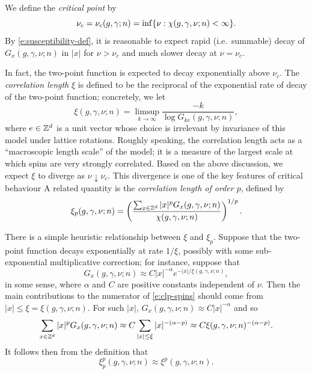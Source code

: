We define the \emph{critical point} by
\begin{equation}
\nu_c = \nu_c(g, \gamma; n) = \inf \{ \nu : \chi(g, \gamma, \nu; n) < \infty \}.
\end{equation}
By \eqref{e:susceptibility-def}, it is
reasonable to expect rapid (i.e.\ summable) decay of $G_x(g, \gamma, \nu; n)$ in $|x|$ for
$\nu > \nu_c$ and much slower decay at $\nu = \nu_c$.

In fact, the two-point function is expected to decay exponentially above $\nu_c$.
The \emph{correlation length} $\xi$ is defined to be the reciprocal of the exponential
rate of decay of the two-point function; concretely, we let
\begin{equation}
\label{e:cl-spins}
\xi(g, \gamma, \nu; n) = \limsup_{k\to\infty} \frac{-k}{\log G_{ke}(g, \gamma, \nu; n)},
\end{equation}
where $e \in { {{\mathbb Z}}^d }$ is a unit vector whose choice is irrelevant by invariance of this model
under lattice rotations.
Roughly speaking, the correlation length acts as
a ``macroscopic length scale'' of the model; it is a measure of the largest scale at
which spins are very strongly correlated. Based on the above discussion, we expect $\xi$
to diverge as $\nu\downarrow\nu_c$. This divergence is one of the
key features of critical behaviour
A related quantity is the \emph{correlation length of order $p$}, defined by
\begin{equation}
\label{e:clp-spins}
\xi_p(g, \gamma, \nu; n)
	=
\left(\frac{\sum_{x\in{ {{\mathbb Z}}^d }} |x|^p G_x(g, \gamma, \nu; n)}{\chi(g, \gamma, \nu; n)}\right)^{1/p}.
\end{equation}

\begin{rk}
There is a simple heuristic relationship between $\xi$ and $\xi_p$. Suppose that
the two-point function decays exponentially at rate $1/\xi$, possibly with some
sub-exponential multiplicative correction; for instance, suppose that
\begin{equation}
G_x(g, \gamma, \nu; n) \approx C |x|^{-\alpha} e^{-|x|/\xi(g, \gamma, \nu; n)},
\end{equation}
in some sense, where $\alpha$ and $C$ are positive constants independent of $\nu$.
Then the main contributions to the numerator of
\eqref{e:clp-spins} should come from $|x| \le \xi = \xi(g, \gamma, \nu; n)$. For such $|x|$,
$G_x(g, \gamma, \nu; n) \approx C |x|^{-\alpha}$ and so
\begin{equation}
\sum_{x\in{ {{\mathbb Z}}^d }} |x|^p G_x(g, \gamma, \nu; n)
	\approx
C \sum_{|x| \le \xi} |x|^{-(\alpha-p)}
	\approx
C \xi(g, \gamma, \nu; n)^{-(\alpha-p)}.
\end{equation}
It follows then from the definition that
\begin{equation}
\xi^p_p(g, \gamma, \nu; n) \approx \xi^p(g, \gamma, \nu; n).
\end{equation}
\end{rk}

